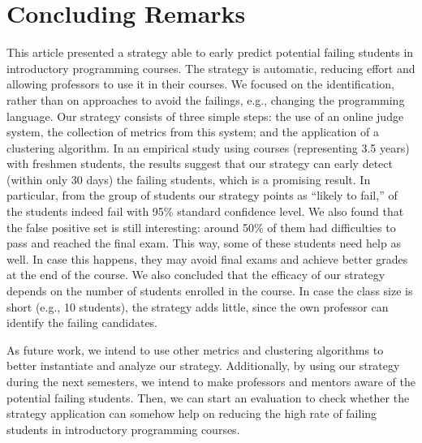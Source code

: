 \section{Concluding Remarks}

\label{sec:conclusion}

This article presented a strategy able to early predict potential failing students in introductory programming courses. The strategy is automatic, reducing effort and allowing professors to use it in their courses. We focused on the identification, rather than on approaches to avoid the failings, e.g., changing the programming language. Our strategy consists of three simple steps: the use of an online judge system, the collection of metrics from this system; and the application of a clustering algorithm. In an empirical study using \semesters courses (representing 3.5 years) with freshmen students, the results suggest that our strategy can early detect (within only 30 days) the failing students, which is a promising result. In particular, from the group of students our strategy points as ``likely to fail,'' \higherPrecision of the students indeed fail with 95\% standard confidence level. We also found that the false positive set is still interesting: around 50\% of them had difficulties to pass and reached the final exam. This way, some of these students need help as well. In case this happens, they may avoid final exams and achieve better grades at the end of the course. We also concluded that the efficacy of our strategy depends on the number of students enrolled in the course. In case the class size is short (e.g., 10 students), the strategy adds little, since the own professor can identify the failing candidates.

As future work, we intend to use other metrics and clustering algorithms to better instantiate and analyze our strategy. Additionally, by using our strategy during the next semesters, we intend to make professors and mentors aware of the potential failing students. Then, we can start an evaluation to check whether the strategy application can somehow help on reducing the high rate of failing students in introductory programming courses.